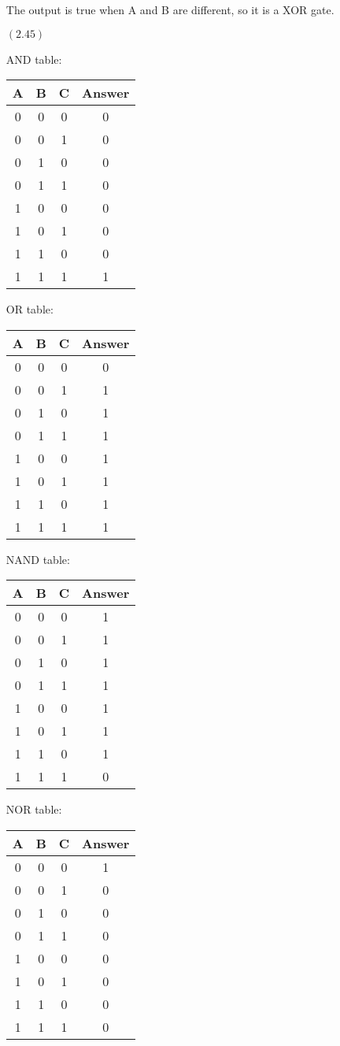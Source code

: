 \documentclass[letterpaper,10pt,titlepage]{article}
\begin{document}
\begin{enumerate}
The output is true when A and B are different, so it is a XOR gate.

\item[$(2.45)$]

 
  AND table:
\begin{tabular}{c|c|c|c}
A & B & C & Answer \\
\hline
0 & 0 & 0 & 0\\
0 & 0 & 1 & 0\\
0 & 1 & 0 & 0\\
0 & 1 & 1 & 0\\
1 & 0 & 0 & 0\\
1 & 0 & 1 & 0\\
1 & 1 & 0 & 0\\
1 & 1 & 1 & 1\\
\end{tabular}

  OR table:
\begin{tabular}{c|c|c|c}
A & B & C & Answer \\
\hline
0 & 0 & 0 & 0\\
0 & 0 & 1 & 1\\
0 & 1 & 0 & 1\\
0 & 1 & 1 & 1\\
1 & 0 & 0 & 1\\
1 & 0 & 1 & 1\\
1 & 1 & 0 & 1\\
1 & 1 & 1 & 1\\
\end{tabular}

  NAND table:
\begin{tabular}{c|c|c|c}
A & B & C & Answer \\
\hline
0 & 0 & 0 & 1\\
0 & 0 & 1 & 1\\
0 & 1 & 0 & 1\\
0 & 1 & 1 & 1\\
1 & 0 & 0 & 1\\
1 & 0 & 1 & 1\\
1 & 1 & 0 & 1\\
1 & 1 & 1 & 0\\
\end{tabular}

  NOR table:
\begin{tabular}{c|c|c|c}
A & B & C & Answer \\
\hline
0 & 0 & 0 & 1\\
0 & 0 & 1 & 0\\
0 & 1 & 0 & 0\\
0 & 1 & 1 & 0\\
1 & 0 & 0 & 0\\
1 & 0 & 1 & 0\\
1 & 1 & 0 & 0\\
1 & 1 & 1 & 0\\
\end{tabular}


\end{enumerate}
\end{document}

